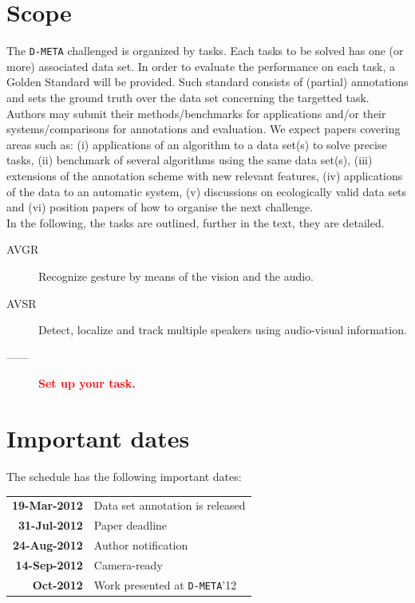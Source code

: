 \documentclass[a4paper]{article}
\newcommand{\todo}[1]{ \textcolor{red}{\bf #1}}
\begin{document}
\section*{Scope}
The \texttt{D-META} challenged is organized by tasks. Each tasks to be solved has one (or more) associated data set. In
order to evaluate the performance on each task, a Golden Standard will be provided. Such standard consists of (partial)
annotations and sets the ground truth over the data set concerning the targetted task.\vspace{0.2cm}\\
Authors may submit their methods/benchmarks for applications and/or their systems/comparisons for
annotations and evaluation. We expect papers covering areas such as: (i) applications of an algorithm to a data
set(s) to solve precise tasks, (ii) benchmark of several algorithms using the same data set(s), (iii) extensions of the
annotation scheme with new relevant features, (iv) applications of the data to an automatic system, (v) discussions on
ecologically valid data sets and (vi) position papers of how to organise the next challenge.\vspace{0.2cm}\\
In the following, the tasks are outlined, further in the text, they are detailed.
\begin{description}
 \item [AVGR] Recognize gesture by means of the vision and the audio.
 \item [AVSR] Detect, localize and track multiple speakers using audio-visual information.
 \item [------] \todo{Set up your task.}
\end{description}

\section*{Important dates}
The schedule has the following important dates:
\begin{center}
\begin{tabular}{rl}
 \textbf{19-Mar-2012} & Data set annotation is released \vspace{0.1cm}\\
 \textbf{31-Jul-2012} & Paper deadline \vspace{0.1cm}\\
 \textbf{24-Aug-2012} & Author notification \vspace{0.1cm}\\
 \textbf{14-Sep-2012} & Camera-ready \vspace{0.1cm}\\
    \textbf{Oct-2012} & Work presented at \texttt{D-META}'12 \vspace{0.1cm}\\
\end{tabular}
\end{center}
\end{document}
